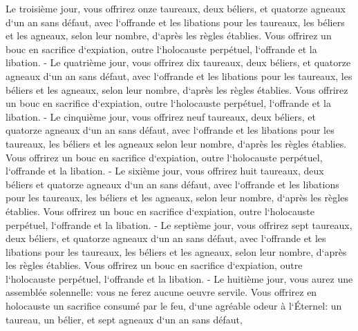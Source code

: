 \verse Le troisième jour, vous offrirez onze taureaux, deux béliers, et quatorze agneaux d`un an sans défaut, 
\verse avec l`offrande et les libations pour les taureaux, les béliers et les agneaux, selon leur nombre, d`après les règles établies. 
\verse Vous offrirez un bouc en sacrifice d`expiation, outre l`holocauste perpétuel, l`offrande et la libation. - 
\verse Le quatrième jour, vous offrirez dix taureaux, deux béliers, et quatorze agneaux d`un an sans défaut, 
\verse avec l`offrande et les libations pour les taureaux, les béliers et les agneaux, selon leur nombre, d`après les règles établies. 
\verse Vous offrirez un bouc en sacrifice d`expiation, outre l`holocauste perpétuel, l`offrande et la libation. - 
\verse Le cinquième jour, vous offrirez neuf taureaux, deux béliers, et quatorze agneaux d`un an sans défaut, 
\verse avec l`offrande et les libations pour les taureaux, les béliers et les agneaux selon leur nombre, d`après les règles établies. 
\verse Vous offrirez un bouc en sacrifice d`expiation, outre l`holocauste perpétuel, l`offrande et la libation. - 
\verse Le sixième jour, vous offrirez huit taureaux, deux béliers et quatorze agneaux d`un an sans défaut, 
\verse avec l`offrande et les libations pour les taureaux, les béliers et les agneaux, selon leur nombre, d`après les règles établies. 
\verse Vous offrirez un bouc en sacrifice d`expiation, outre l`holocauste perpétuel, l`offrande et la libation. - 
\verse Le septième jour, vous offrirez sept taureaux, deux béliers, et quatorze agneaux d`un an sans défaut, 
\verse avec l`offrande et les libations pour les taureaux, les béliers et les agneaux, selon leur nombre, d`après les règles établies. 
\verse Vous offrirez un bouc en sacrifice d`expiation, outre l`holocauste perpétuel, l`offrande et la libation. - 
\verse Le huitième jour, vous aurez une assemblée solennelle: vous ne ferez aucune oeuvre servile. 
\verse Vous offrirez en holocauste un sacrifice consumé par le feu, d`une agréable odeur à l`Éternel: un taureau, un bélier, et sept agneaux d`un an sans défaut, 
